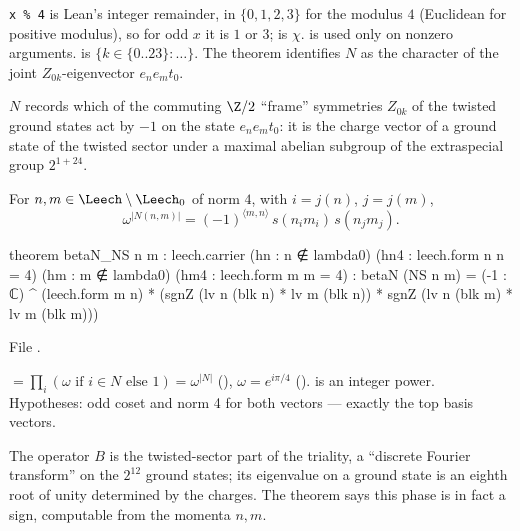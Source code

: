 \begin{dictionary}
\texttt{x \% 4} is Lean's integer remainder, in $\{0,1,2,3\}$ for the modulus $4$ (Euclidean for positive
modulus), so for odd $x$ it is $1$ or $3$;  is $\chi$.   is used only on nonzero
arguments.   is $\{k\in\{0..23\}:\ldots\}$.  The theorem  identifies
$N$ as the character of the joint $Z_{0k}$-eigenvector $e_ne_mt_0$.
\end{dictionary}

\begin{physics}
$N$ records which of the commuting $\Z/2$ ``frame'' symmetries $Z_{0k}$ of the twisted ground states act by
$-1$ on the state $e_ne_mt_0$: it is the charge vector of a ground state of the twisted sector under a
maximal abelian subgroup of the extraspecial group $2^{1+24}$.
\end{physics}

\begin{theorem}\label{ch14:thm:betaN}
For $n,m\in\Leech\setminus\Leech_0$ of norm $4$, with $i=j(n)$, $j=j(m)$,
\begin{equation*}
  \omega^{|N(n,m)|}=(-1)^{\langle m,n\rangle}\,s(n_im_i)\,s(n_jm_j).
\end{equation*}
\end{theorem}
\begin{leancode}
theorem betaN_NS {n m : leech.carrier} (hn : n ∉ lambda0) (hn4 : leech.form n n = 4)
    (hm : m ∉ lambda0) (hm4 : leech.form m m = 4) :
    betaN (NS n m) = (-1 : ℂ) ^ (leech.form m n)
      * (sgnZ (lv n (blk n) * lv m (blk n)) * sgnZ (lv n (blk m) * lv m (blk m)))
\end{leancode}
File .

\begin{dictionary}
 $=\prod_i(\omega\text{ if }i\in N\text{ else }1)=\omega^{|N|}$ (), $\omega=e^{i\pi/4}$
().   is an integer power.  Hypotheses: odd coset and norm 4
for both vectors — exactly the top basis vectors.
\end{dictionary}

\begin{physics}
The operator $B$ is the twisted-sector part of the triality, a ``discrete Fourier transform'' on the
$2^{12}$ ground states; its eigenvalue on a ground state is an eighth root of unity determined by the
charges.  The theorem says this phase is in fact a sign, computable from the momenta $n,m$.
\end{physics}

